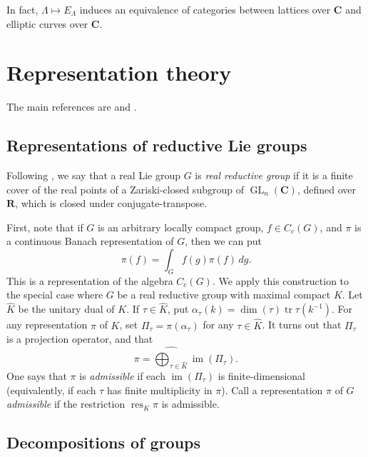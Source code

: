 \documentclass{article}
\DeclareMathOperator{\generallinear}{GL}
\DeclareMathOperator{\image}{im}
\DeclareMathOperator{\restrict}{res}
\DeclareMathOperator{\trace}{tr}
\newcommand{\dC}{\mathbf{C}}
\newcommand{\dR}{\mathbf{R}}
\theoremstyle{definition}
\begin{document}
In fact, $\Lambda \mapsto E_\Lambda$ induces an equivalence of categories 
between lattices over $\dC$ and elliptic curves over $\dC$. 





\section{Representation theory}

The main references are \cite{kn79} and \cite{do97}. 


\subsection{Representations of reductive Lie groups}

Following \cite{wa88}, we say that a real Lie group $G$ is \emph{real 
reductive group} if it is a finite cover of the real points of a Zariski-closed 
subgroup of $\generallinear_n(\dC)$, defined over $\dR$, which is closed under 
conjugate-transpose. 

First, note that if $G$ is an arbitrary locally compact group, $f\in C_c(G)$, 
and $\pi$ is a continuous Banach representation of $G$, then we can put 
\[
  \pi(f) = \int_G f(g) \pi(f)\, dg .
\]
This is a representation of the algebra $C_c(G)$. We apply this construction 
to the special case where $G$ be a real reductive group with maximal compact 
$K$. Let $\widehat K$ be the unitary dual of $K$. If $\tau\in \widehat K$, 
put $\alpha_\tau(k) = \dim(\tau) \trace \tau(k^{-1})$. For any representation 
$\pi$ of $K$, set $\Pi_\tau = \pi(\alpha_\tau)$ for any $\tau\in \widehat K$. 
It turns out that $\Pi_\tau$ is a projection operator, and that 
\[
  \pi = \widehat{\displaystyle\bigoplus_{\tau\in \widehat K}} \image(\Pi_\tau) .
\]
One says that $\pi$ is \emph{admissible} if each $\image(\Pi_\tau)$ is 
finite-dimensional (equivalently, if each $\tau$ has finite multiplicity in 
$\pi$). Call a representation $\pi$ of $G$ \emph{admissible} if the restriction 
$\restrict_K \pi$ is admissible. 


\subsection{Decompositions of groups}
\end{document}
